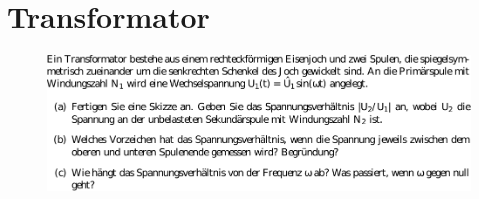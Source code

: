 \section{Transformator}
\label{sec:Transformator}
\begin{figure}
 \centering
 \includegraphics{media/transformator.pdf}
 \label{fig:Transformator}
\end{figure}
